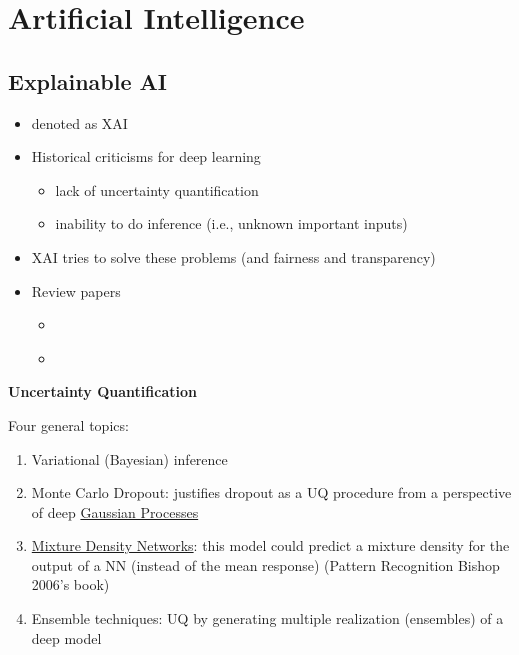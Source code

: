 \documentclass[
]{book}
\providecommand{\tightlist}{%
  \setlength{\itemsep}{0pt}\setlength{\parskip}{0pt}}
\begin{document}
\hypertarget{artificial-intelligence}{%
\chapter{Artificial Intelligence}\label{artificial-intelligence}}

\hypertarget{explainable-ai}{%
\section{Explainable AI}\label{explainable-ai}}

\begin{itemize}
\item
  denoted as XAI
\item
  Historical criticisms for deep learning

  \begin{itemize}
  \item
    lack of uncertainty quantification
  \item
    inability to do inference (i.e., unknown important inputs)
  \end{itemize}
\item
  XAI tries to solve these problems (and fairness and transparency)
\item
  Review papers

  \begin{itemize}
  \item
    \citet{samek2021a}
  \item
    \citet{abdar2021}
  \end{itemize}
\end{itemize}

\textbf{Uncertainty Quantification}

Four general topics:

\begin{enumerate}
\def\labelenumi{\arabic{enumi}.}
\tightlist
\item
  Variational (Bayesian) inference
\item
  Monte Carlo Dropout: justifies dropout as a UQ procedure from a perspective of deep \protect\hyperlink{gaussian-process-regression}{Gaussian Processes}
\item
  \protect\hyperlink{mixture-density-networks}{Mixture Density Networks}: this model could predict a mixture density for the output of a NN (instead of the mean response) (Pattern Recognition Bishop 2006's book)
\item
  Ensemble techniques: UQ by generating multiple realization (ensembles) of a deep model
\end{enumerate}
\end{document}
